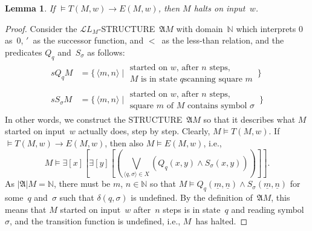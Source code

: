 \documentclass[10pt,a4paper]{article}
\newcommand*{\olup}[1]{\MakeUppercase{#1}}
\theoremstyle{plain}
\newtheorem{lem}[thm]{Lemma}
\theoremstyle{definition}
\theoremstyle{remark}
\newcommand*{\ollabel}[1]{\label{#1}}
\providecommand{\lif}{\mathbin{\rightarrow}}
\providecommand{\lexists}{\mathord{\exists}}
\providecommand{\Entails}{\mathrel{\models}}
\providecommand{\Obj}{}
\providecommand{\Struct}{\ensuremath{\mathfrak{A}}}
\providecommand{\Domain}{\ensuremath{|\mathfrak{A}|}}
\providecommand{\Assign}{\ensuremath{s}}
\providecommand{\Sat}[2]{\ensuremath{#1 \models #2}}
\providecommand{\Lang}{\ensuremath{\mathcal{L}}}
\providecommand{\tuple}[1]{\langle #1 \rangle}
\providecommand{\num}[1]{\underline{#1}}
\providecommand{\Nat}{\ensuremath{\mathbb{N}}}
\providecommand{\Setabs}[2]{\{\, #1 \mid #2 \,\}}
\begin{document}
\begin{lem}
\ollabel{lem:halt-if-valid}
If $\Entails T(M, w) \lif E(M, w)$, then $M$ halts on input~$w$.
\end{lem}

\begin{proof}
Consider the $\Lang L_M$-\olup{structure}~$\Struct M$ with
domain~$\Nat$ which interprets $\Obj 0$ as~$0$, $\prime$~as the successor
function, and $<$~as the less-than relation, and the predicates $\Obj Q_q$
and~$\Obj S_\sigma$ as follows:
\begin{align*}
  \Assign{\Obj Q_q}{M} & =
\Setabs{\tuple{m, n}}{\begin{array}{ll}\text{started on~$w$, after~$n$ steps,}\\ \text{$M$ is in state $q$
  scanning square~$m$}\end{array}} \\
\Assign{\Obj S_\sigma}{M} & = \Setabs{\tuple{m, n}}{\begin{array}{ll}
\text{started on~$w$, after $n$ steps,}\\ \text{square~$m$ of $M$ contains
  symbol~$\sigma$}\end{array}}
\end{align*}
In other words, we construct the \olup{structure}~$\Struct{M}$ so that it
describes what $M$ started on input~$w$ actually does, step by step.
Clearly, $\Sat{M}{T(M, w)}$. If $\Entails T(M, w) \lif E(M, w)$,
then also $\Sat{M}{E(M, w)}$, i.e.,
\[
\Sat{M}{\lexists[x][\lexists[y][(\bigvee_{\tuple{q, \sigma} \in
      X}(\Obj Q_q(x, y) \land \Obj S_\sigma(x, y)))]]}.
\]
As $\Domain{M} = \Nat$, there must be $m$, $n \in \Nat$ so that
$\Sat{M}{\Obj Q_q(\num{m}, \num{n}) \land \Obj S_\sigma(\num{m},
\num{n})}$ for some~$q$ and~$\sigma$ such that $\delta(q, \sigma)$ is
undefined. By the definition of~$\Struct M$, this means that $M$
started on input~$w$ after~$n$ steps is in state~$q$ and reading
symbol~$\sigma$, and the transition function is undefined, i.e.,
$M$~has halted.
\end{proof}
\end{document}
